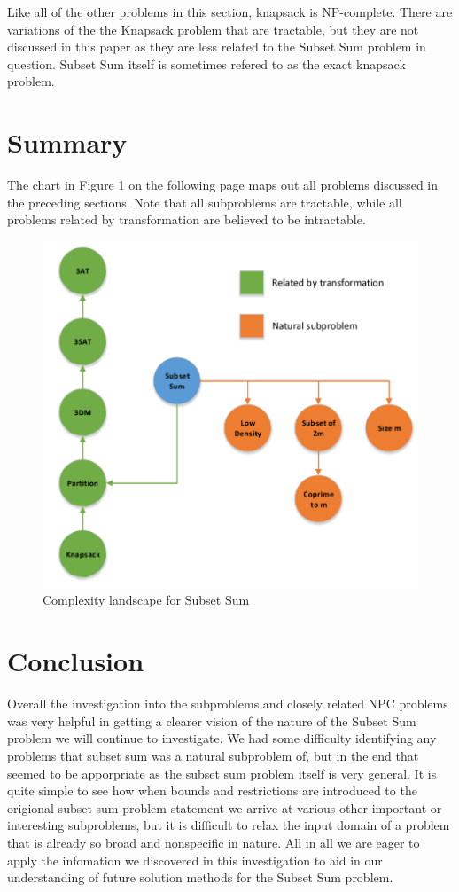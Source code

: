 \documentclass{article}
\begin{document}
Like all of the other problems in this section, knapsack is NP-complete. There are variations of the the Knapsack problem that are
tractable, but they are not discussed in this paper as they are less related to the Subset Sum problem in question. Subset Sum itself
is sometimes refered to as the exact knapsack problem.

\section{Summary}

The chart in Figure 1 on the following page maps out all problems discussed in the preceding sections. Note that all subproblems are tractable, while all problems related by
transformation are believed to be intractable.

\begin{figure}[h]
\centering
\includegraphics[width=12cm]{comp_chart.png}
\caption{Complexity landscape for Subset Sum}
\end{figure}

\section{Conclusion}

Overall the investigation into the subproblems and closely related NPC problems was very helpful in getting a clearer vision of
the nature of the Subset Sum problem we will continue to investigate. We had some difficulty identifying any problems that
subset sum was a natural subproblem of, but in the end that seemed to be apporpriate as the subset sum problem itself is very general.
It is quite simple to see how when bounds and restrictions are introduced to the origional subset sum problem statement we arrive at
various other important or interesting subproblems, but it is difficult to relax the input domain of a problem that is already so
broad and nonspecific in nature. All in all we are eager to apply the infomation we discovered in this investigation to aid in our
understanding of future solution methods for the Subset Sum problem.



\end{document}
